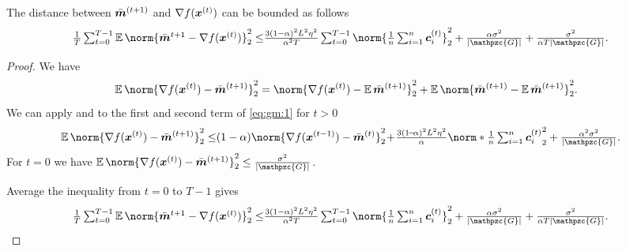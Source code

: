 \documentclass{article}
\newcommand{\gset}{\ensuremath{{\mathpzc{G}}}}
\begin{document}
\begin{lemma}\label{lemma:gm}
  The distance between $\bar{\bm{m}}^{(t+1)}$ and $\nabla f(\bm{x}^{(t)})$ can be bounded as follows
  \begin{align*}
    \tfrac{1}{T} \tsum_{t=0}^{T-1}
    \E\norm{\bar{\mm}^{t+1} - \nabla f(\xx^{(t)}) }_2^2
    \le & \tfrac{3(1-\alpha)^2 L^2\eta^2}{\alpha^2T} \tsum_{t=0}^{T-1}
    \norm{ \tfrac{1}{n} \tsum_{i=1}^n \cc_i^{(t)} }_2^2
    + \tfrac{\alpha\sigma^2}{|\gset|} + \tfrac{\sigma^2}{\alpha T|\gset|}.
  \end{align*}
\end{lemma}

\begin{proof}
  We have
  \begin{equation}\label{eq:gm:1}
    \E\norm{\nabla f(\xx^{(t)}) - \bar{\mm}^{(t+1)} }_2^2
    =
    \norm{\nabla f(\xx^{(t)}) - \E \bar{\mm}^{(t+1)} }_2^2
    + \E\norm{\bar{\mm}^{(t+1)} - \E \bar{\mm}^{(t+1)} }_2^2.
  \end{equation}
  We can apply  and  to the first and second term of \eqref{eq:gm:1} for $t>0$
  \begin{align*}
    \E\norm{\nabla f(\xx^{(t)}) - \bar{\mm}^{(t+1)} }_2^2
    \le &
    (1-\alpha) \norm{\nabla f(\xx^{(t-1)})- \bar{\mm}^{(t)}}_2^2
    \!+\! \tfrac{3(1\!-\!\alpha)^2L^2 \eta^2}{\alpha}  \norm*{ \tfrac{1}{n} \tsum_{i=1}^n \cc_i^{(t)} }_2^2  + \tfrac{\alpha^2\sigma^2}{|\gset|}.
  \end{align*}
  For $t=0$ we have $\E\norm{\nabla f(\xx^{(t)}) - \bar{\mm}^{(t+1)} }_2^2 \leq \tfrac{\sigma^2}{|\gset|}$.

  Average the inequality from $t=0$ to $T-1$ gives
  \begin{align*}
    \tfrac{1}{T} \tsum_{t=0}^{T-1}
    \E\norm{\bar{\mm}^{t+1} - \nabla f(\xx^{(t)}) }_2^2
    \le & \tfrac{3(1-\alpha)^2L^2\eta^2}{\alpha^2T} \tsum_{t=0}^{T-1}
    \norm{ \tfrac{1}{n} \tsum_{i=1}^n \cc_i^{(t)} }_2^2
    + \tfrac{\alpha\sigma^2}{|\gset|} + \tfrac{\sigma^2}{\alpha T|\gset|}.
  \end{align*}
\end{proof}
\end{document}
